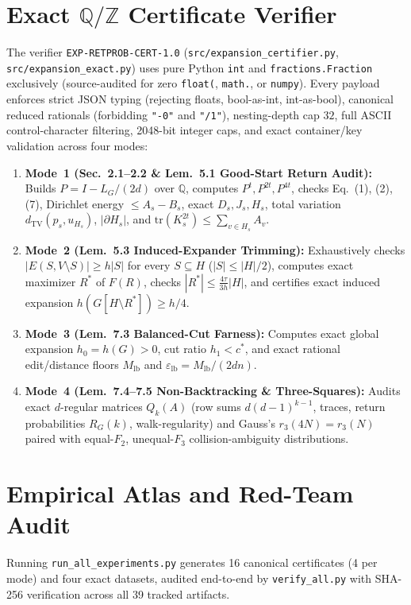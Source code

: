 \documentclass[10pt,twocolumn]{article}
\begin{document}
\section{Exact \texorpdfstring{$\mathbb{Q}/\mathbb{Z}$}{Q/Z} Certificate Verifier}\label{sec:cert}
The verifier \texttt{EXP-RETPROB-CERT-1.0} (\texttt{src/expansion\_certifier.py}, \texttt{src/expansion\_exact.py}) uses pure Python \texttt{int} and \texttt{fractions.Fraction} exclusively (source-audited for zero \texttt{float(}, \texttt{math.}, or \texttt{numpy}). Every payload enforces strict JSON typing (rejecting floats, bool-as-int, int-as-bool), canonical reduced rationals (forbidding \texttt{"-0"} and \texttt{"/1"}), nesting-depth cap $32$, full ASCII control-character filtering, 2048-bit integer caps, and exact container/key validation across four modes:
\begin{enumerate}[leftmargin=*,nosep]
  \item \textbf{Mode~1 (Sec.~2.1--2.2 \& Lem.~5.1 Good-Start Return Audit):} Builds $P = I - L_G/(2d)$ over $\mathbb{Q}$, computes $P^t, P^{2t}, P^{4t}$, checks Eq.~(1), (2), (7), Dirichlet energy $\le A_s - B_s$, exact $D_s, J_s, H_s$, total variation $d_{\mathrm{TV}}(p_s, u_{H_s})$, $|\partial H_s|$, and $\mathrm{tr}(K_s^{2t}) \le \sum_{v\in H_s} A_v$.
  \item \textbf{Mode~2 (Lem.~5.3 Induced-Expander Trimming):} Exhaustively checks $|E(S, V\setminus S)| \ge h|S|$ for every $S \subseteq H$ ($|S| \le |H|/2$), computes exact maximizer $R^*$ of $F(R)$, checks $|R^*| \le \frac{4\tau}{3h}|H|$, and certifies exact induced expansion $h(G[H\setminus R^*]) \ge h/4$.
  \item \textbf{Mode~3 (Lem.~7.3 Balanced-Cut Farness):} Computes exact global expansion $h_0 = h(G) > 0$, cut ratio $h_1 < c^*$, and exact rational edit/distance floors $M_{\mathrm{lb}}$ and $\varepsilon_{\mathrm{lb}} = M_{\mathrm{lb}}/(2dn)$.
  \item \textbf{Mode~4 (Lem.~7.4--7.5 Non-Backtracking \& Three-Squares):} Audits exact $d$-regular matrices $Q_k(A)$ (row sums $d(d-1)^{k-1}$, traces, return probabilities $R_G(k)$, walk-regularity) and Gauss's $r_3(4N)=r_3(N)$ paired with equal-$F_2$, unequal-$F_3$ collision-ambiguity distributions.
\end{enumerate}

\section{Empirical Atlas and Red-Team Audit}\label{sec:results}
Running \texttt{run\_all\_experiments.py} generates 16 canonical certificates (4 per mode) and four exact datasets, audited end-to-end by \texttt{verify\_all.py} with SHA-256 verification across all 39 tracked artifacts.
\end{document}
